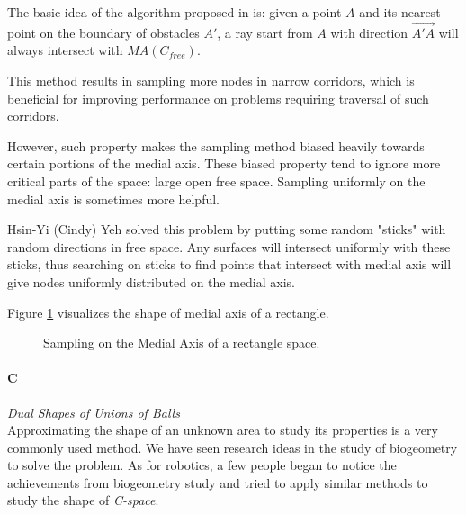 \documentclass[11pt]{article}
\begin{document}
\indent The basic idea of the algorithm proposed in \cite{MAPRM} is: given a point $A$ and its nearest point on the boundary of obstacles $A'$, a ray start from $A$ with direction $\overrightarrow{A'A}$ will always intersect with $MA(C_{free})$.

\indent This method results in sampling more nodes in narrow corridors, which is beneficial for improving performance on problems requiring traversal of such corridors.

\indent However, such property makes the sampling method biased heavily towards certain portions of the medial axis. These biased property tend to ignore more critical parts of the space: large open free space. Sampling uniformly on the medial axis is sometimes more helpful.

\indent Hsin-Yi (Cindy) Yeh \cite{UMAPRM} solved this problem by putting some random "sticks" with random directions in free space. Any surfaces will intersect uniformly with these sticks, thus searching on sticks to find points that intersect with medial axis will give nodes uniformly distributed on the medial axis.

\indent Figure \ref{fig:Medial Axis} visualizes the shape of medial axis of a rectangle.

\begin{figure}
	\caption{\label{fig:Medial Axis} Sampling on the Medial Axis of a rectangle space.\cite{Book}}
\end{figure}


\paragraph{C} \emph{Dual Shapes of Unions of Balls} \hfill\\
\indent Approximating the shape of an unknown area to study its properties is a very commonly used method. We have seen research ideas in the study of biogeometry to solve the problem. As for robotics, a few people began to notice the achievements from biogeometry study and tried to apply similar methods to study the shape of \emph{C-space}. \cite{alpha intro} 
\end{document}
